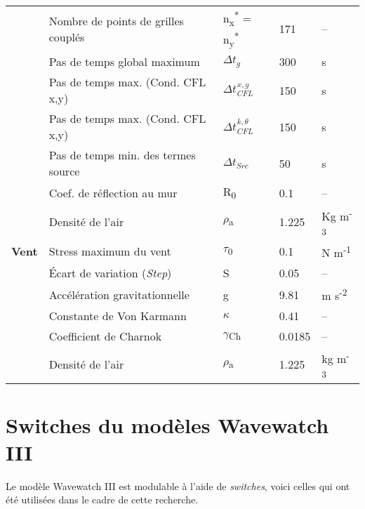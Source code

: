 \documentclass[10pt]{report}
\numberwithin{equation}{section}
\newcommand{\pt}{\hspace{1pt}} %
\begin{document}
\begin{center}
\begin{tabular}{lllll}
 & Nombre de points de grilles couplés & n\textsubscript{x}\textsuperscript{*} = n\textsubscript{y}\textsuperscript{*} & 171 & --\\
 & Pas de temps global maximum & \(\Delta t_g\) & 300 & s\\
 & Pas de temps max. (Cond. CFL x,y) & \(\Delta t_{\pt CFL}^{\pt x,y}\) & 150 & s\\
 & Pas de temps max. (Cond. CFL x,y) & \(\Delta t_{\pt CFL}^{\pt k,\theta}\) & 150 & s\\
 & Pas de temps min. des termes source & \(\Delta t_{Src}\) & 50 & s\\
 & Coef. de réflection au mur & R\textsubscript{0} & 0.1 & --\\
 & Densité de l'air & \(\rho\)\textsubscript{a} & 1.225 & Kg m\textsuperscript{-3}\\
\hline
\textbf{Vent} & Stress maximum du vent & \(\tau\)\textsubscript{0} & 0.1 & N m\textsuperscript{-1}\\
 & Écart de variation (\emph{Step}) & S & 0.05 & --\\
 & Accélération gravitationnelle & g & 9.81 & m s\textsuperscript{-2}\\
 & Constante de Von Karmann & \(\kappa\) & 0.41 & --\\
 & Coefficient de Charnok & \(\gamma\)\textsubscript{Ch} & 0.0185 & --\\
 & Densité de l'air & \(\rho\)\textsubscript{a} & 1.225 & kg m\textsuperscript{-3}\\
\hline
\end{tabular}
\end{center}
\section{Switches du modèles Wavewatch III}
\label{sec:org24c5eff}

Le modèle Wavewatch III est modulable à l'aide de \emph{switches}, voici celles qui ont été utilisées dans le cadre de cette recherche. 
\end{document}
